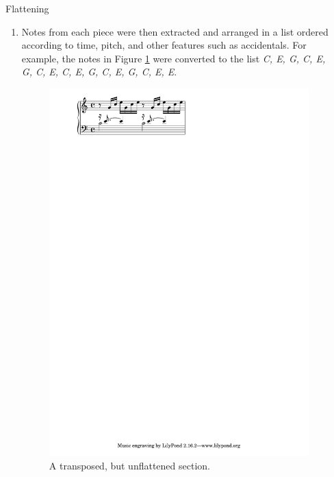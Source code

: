 \documentclass[final]{beamer}
\newlength{\sepwid}
\newlength{\sepwidtwo}
\newlength{\onecolwid}
\newlength{\onecolwidtwo}
\newlength{\halfcolwid}
\newlength{\halfcolwidtwo}
\begin{document}
\begin{frame}[t]
\begin{columns}[t]
\begin{column}{\onecolwidtwo}
\begin{columns}[t]
\begin{column}{\halfcolwidtwo}
\begin{block}{Flattening}
\begin{enumerate}
\begin{figure}
\caption{One of the pieces which was processed.}
\end{figure}
\item{Notes from each piece were then extracted and arranged in a list ordered according to time, pitch, and other features such as accidentals. For example, the notes in Figure \ref{wtk1} were converted to the list \emph{C, E, G, C, E, G, C, E, C, E, G, C, E, G, C, E, E}.}
\begin{figure}
\includegraphics[width=1\halfcolwidtwo]{Visuals/WTK1.pdf}
\caption{A transposed, but unflattened section.}
\label{wtk1}
\end{figure}
\end{enumerate}
\end{block}

\end{column}

\begin{column}{\sepwidtwo}\end{column} %


\end{columns}
\end{column}
\end{columns}
\end{frame}
\end{document}
